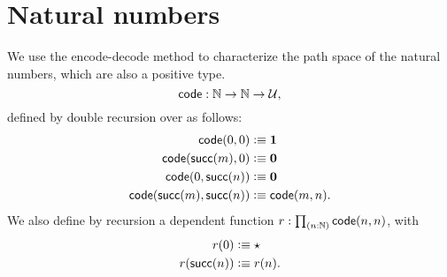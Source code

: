 \documentclass[hott-all.tex]{subfiles}
\begin{document}
\section{Natural numbers}
\label{sec:compute-nat}

We use the encode-decode method to characterize the path space of the natural numbers, which are also a positive type.
\[\mathsf{code}:\mathbb{N}\to\mathbb{N}\to\mathcal{U},\]
defined by double recursion over \N as follows:
\begin{align*}
  \mathsf{code}(0,0) &\vcentcolon\equiv \mathbf{1}\\
  \mathsf{code}(\mathsf{succ}(m),0) &\vcentcolon\equiv \mathbf{0}\\
  \mathsf{code}(0,\mathsf{succ}(n)) &\vcentcolon\equiv \mathbf{0}\\
  \mathsf{code}(\mathsf{succ}(m),\mathsf{succ}(n)) &\vcentcolon\equiv \mathsf{code}(m,n).
\end{align*}
We also define by recursion a dependent function $r:\prd{n:\N} \code(n,n)$, with
\begin{align*}
  r(0) &\vcentcolon\equiv \star\\
  r(\mathsf{succ}(n)) &\vcentcolon\equiv r(n).
\end{align*}
\end{document}
